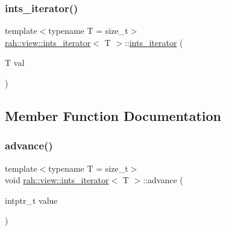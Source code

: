 \mbox{\label{structrah_1_1view_1_1ints__iterator_aff7958341e1e99c7bf232db2acbb1622}} 
\subsubsection{\texorpdfstring{ints\_iterator()}{ints\_iterator()}\hspace{0.1cm}{\footnotesize\ttfamily [2/2]}}
{\footnotesize\ttfamily template$<$typename T  = size\+\_\+t$>$ \\
\mbox{\hyperlink{structrah_1_1view_1_1ints__iterator}{rah\+::view\+::ints\+\_\+iterator}}$<$ T $>$\+::\mbox{\hyperlink{structrah_1_1view_1_1ints__iterator}{ints\+\_\+iterator}} (\begin{DoxyParamCaption}\item[{T}]{val }\end{DoxyParamCaption})\hspace{0.3cm}{\ttfamily [inline]}}



\subsection{Member Function Documentation}
\mbox{\label{structrah_1_1view_1_1ints__iterator_a0f8e2c678b31a59deaa522f967c86518}} 
\subsubsection{\texorpdfstring{advance()}{advance()}}
{\footnotesize\ttfamily template$<$typename T  = size\+\_\+t$>$ \\
void \mbox{\hyperlink{structrah_1_1view_1_1ints__iterator}{rah\+::view\+::ints\+\_\+iterator}}$<$ T $>$\+::advance (\begin{DoxyParamCaption}\item[{intptr\+\_\+t}]{value }\end{DoxyParamCaption})\hspace{0.3cm}{\ttfamily [inline]}}

